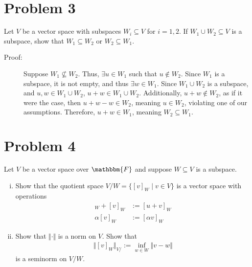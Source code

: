 \documentclass[10pt]{extarticle}
\begin{document}
  \section{Problem 3}%
  Let $V$ be a vector space with subspaces $W_i\subseteq V$ for $i=1,2$. If $W_1\cup W_2\subseteq V$ is a subspace, show that $W_1\subseteq W_2$ or $W_2\subseteq W_1$.
  \begin{description}
    \item[Proof:] Suppose $W_1\nsubseteq W_2$. Thus, $\exists u\in W_1$ such that $u\notin W_2$. Since $W_1$ is a subspace, it is not empty, and thus $\exists w\in W_1$. Since $W_1\cup W_2$ is a subspace, and $u,w\in W_1\cup W_2$, $u+w\in W_1\cup W_2$. Additionally, $u+w\notin W_2$, as if it were the case, then $u+w-w\in W_2$, meaning $u\in W_2$, violating one of our assumptions. Therefore, $u+w\in W_1$, meaning $W_2\subseteq W_1$. 
  \end{description}
  \section{Problem 4}%
    Let $V$ be a vector space over $\mathbbm{F}$ and suppose $W\subseteq V$ is a subspace.
    \begin{enumerate}[(i)]
      \item Show that the quotient space $V/W = \{[v]_W\mid v\in V\}$ is a vector space with operations
        \begin{align*}
          [u]_W + [v]_W &:=[u+v]_W\\
          \alpha[v]_W &:= [\alpha v]_W
        \end{align*}
      \item Show that $\Vert \cdot \Vert$ is a norm on $V$. Show that
        \begin{align*}
          \Vert [v]_W\Vert_{V/} := \inf_{w\in W}\Vert v-w\Vert
        \end{align*}
        is a seminorm on $V/W$.
    \end{enumerate}
\end{document}
